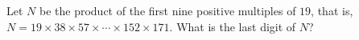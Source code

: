 Let $N$ be the product of the first nine positive multiples of $19$, that is, $N=19\times38\times57\times\cdots\times152\times171$. What is the last digit of $N$?
